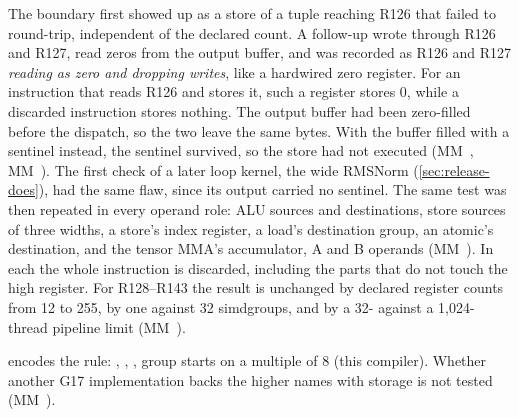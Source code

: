 The boundary first showed up as a store of a tuple reaching R126 that failed to round-trip, independent of the
declared count. A follow-up wrote through R126 and R127, read zeros from the output buffer, and was recorded as
R126 and R127 \emph{reading as zero and dropping writes}, like a hardwired zero register. For an instruction that reads
R126 and stores it, such a register stores 0, while a discarded instruction stores nothing. The output buffer had been
zero-filled before the dispatch, so the two leave the same bytes. With the buffer filled with a sentinel instead, the
sentinel survived, so the store had not executed (MM~, MM~). The first check of a later loop kernel,
the wide RMSNorm (\cref{sec:release-does}), had the same flaw, since its output carried no sentinel.
The same test was then repeated in every operand role: ALU sources and destinations, store sources of three widths, a
store's index register, a load's destination group, an atomic's destination, and the tensor MMA's accumulator, A and B
operands (MM~). In each the whole instruction is discarded, including the parts that do not touch the high register. For R128–R143 the result
is unchanged by declared register counts from 12 to 255, by one against 32 simdgroups, and by a 32- against a
1,024-thread pipeline limit (MM~).

 encodes the rule: , ,
, group starts on a multiple of 8 (this compiler). Whether another G17 implementation backs the higher names with storage is not tested (MM~).

